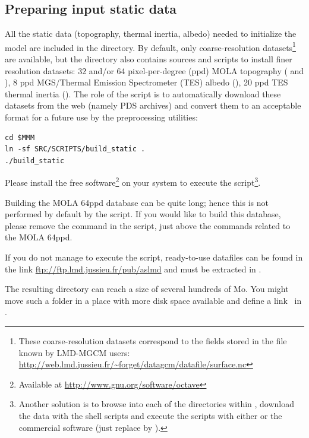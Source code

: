 \sk
\subsection{Preparing input static data}\label{wpsgeog}

\sk
All the static data (topography, thermal inertia, albedo) needed to initialize the model are included in the  directory. By default, only coarse-resolution datasets\footnote{These coarse-resolution datasets correspond to the fields stored in the file  known by LMD-MGCM users: \url{http://web.lmd.jussieu.fr/~forget/datagcm/datafile/surface.nc} } are available, but the directory also contains sources and scripts to install finer resolution datasets: 32 and/or 64 pixel-per-degree (ppd) MOLA topography ( and ), 8 ppd MGS/Thermal Emission Spectrometer (TES) albedo (), 20 ppd TES thermal inertia (). The role of the  script is to automatically download these datasets from the web (namely PDS archives) and convert them to an acceptable format for a future use by the preprocessing utilities:

\begin{verbatim}
cd $MMM
ln -sf SRC/SCRIPTS/build_static .
./build_static
\end{verbatim}

\sk
\begin{finger}
\item Please install the  free software\footnote{Available at \url{http://www.gnu.org/software/octave} } on your system to execute the  script\footnote{ Another solution is to browse into each of the directories within , download the data with the shell scripts and execute the  scripts with either  or the commercial software  (just replace \ttt{\#} by \ttt{\%}). }. 
\item Building the MOLA 64ppd database can be quite long; hence this is not performed by default by the  script. If you would like to build this database, please remove the  command in the script, just above the commands related to the MOLA 64ppd.
\item If you do not manage to execute the  script, ready-to-use datafiles can be found in the link \url{ftp://ftp.lmd.jussieu.fr/pub/aslmd} and must be extracted in .
\item The resulting  directory can reach a size of several hundreds of Mo. You might move such a folder in a place with more disk space available and define a link~ in .
\end{finger}

